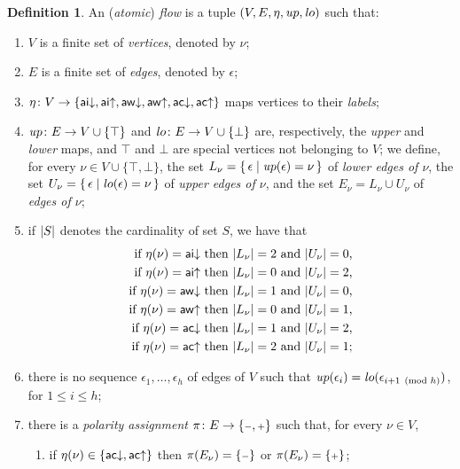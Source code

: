 \documentclass[a4paper]{amsart}
\theoremstyle{remark}
\theoremstyle{definition}
\newtheorem{defi}[thm]{Definition}
\begin{document}
\begin{defi}
An (\emph{atomic}) \emph{flow} is a tuple $(V,E,\eta,{\mathit up},{\mathit lo})$ such that:
\begin{enumerate}
\item $V$ is a finite set of \emph{vertices}, denoted by $\nu$;
\item $E$ is a finite set of \emph{edges}, denoted by $\epsilon$;
\item $\eta\colon V\to\{{\mathsf{ai}{\downarrow}},{\mathsf{ai}{\uparrow}},{\mathsf{aw}{\downarrow}},{\mathsf{aw}{\uparrow}},{\mathsf{ac}{\downarrow}},{\mathsf{ac}{\uparrow}}\}$ maps vertices to their \emph{labels};
\item ${\mathit up}\colon E\to V\cup\{\top\}$ and ${\mathit lo}\colon E\to V\cup\{\bot\}$ are, respectively, the \emph{upper} and \emph{lower} maps, and $\top$ and $\bot$ are special vertices not belonging to $V$; we define, for every $\nu\in V\cup\{\top,\bot\}$, the set $L_\nu=\{\,\epsilon\mid{\mathit up}(\epsilon)=\nu\,\}$ of \emph{lower edges of $\nu$}, the set $U_\nu=\{\,\epsilon\mid{\mathit lo}(\epsilon)=\nu\,\}$ of \emph{upper edges of $\nu$}, and the set $E_\nu=L_\nu\cup U_\nu$ of \emph{edges of $\nu$};
\item if $\mathord\vert S\mathord\vert$ denotes the cardinality of set $S$, we have that
\begin{align*}
\mbox{if $\eta(\nu)={\mathsf{ai}{\downarrow}}$ then $\mathord\vert L_\nu\mathord\vert=2$ and $\mathord\vert U_\nu\mathord\vert=0$,}&\\
\mbox{if $\eta(\nu)={\mathsf{ai}{\uparrow}}$ then $\mathord\vert L_\nu\mathord\vert=0$ and $\mathord\vert U_\nu\mathord\vert=2$,}&\\
\mbox{if $\eta(\nu)={\mathsf{aw}{\downarrow}}$ then $\mathord\vert L_\nu\mathord\vert=1$ and $\mathord\vert U_\nu\mathord\vert=0$,}&\\
\mbox{if $\eta(\nu)={\mathsf{aw}{\uparrow}}$ then $\mathord\vert L_\nu\mathord\vert=0$ and $\mathord\vert U_\nu\mathord\vert=1$,}&\\
\mbox{if $\eta(\nu)={\mathsf{ac}{\downarrow}}$ then $\mathord\vert L_\nu\mathord\vert=1$ and $\mathord\vert U_\nu\mathord\vert=2$,}&\\
\mbox{if $\eta(\nu)={\mathsf{ac}{\uparrow}}$ then $\mathord\vert L_\nu\mathord\vert=2$ and $\mathord\vert U_\nu\mathord\vert=1$;}&
\end{align*}
\item\label{ItAcycl} there is no sequence $\epsilon_1,\dots,\epsilon_h$ of edges of $V$ such that ${\mathit up}(\epsilon_i)={\mathit lo}(\epsilon_{i+1\pmod h})$, for $1\le i\le h$;
\item\label{ItPol} there is a \emph{polarity assignment} $\pi\colon E\to\{\pmi,\ppl\}$ such that, for every $\nu\in V$,
\begin{enumerate}
\item if $\eta(\nu)\in\{{\mathsf{ac}{\downarrow}},{\mathsf{ac}{\uparrow}}\}$ then $\pi(E_\nu)=\{\pmi\}$ or $\pi(E_\nu)=\{\ppl\}$;

\end{enumerate}
\end{enumerate}
\end{defi}
\end{document}

